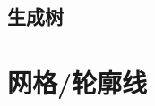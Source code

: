 \subsection{生成树}

\begin{example}
    
\end{example}

\begin{example}[最小斯坦纳树]
    
\end{example}


\section{网格/轮廓线}

\begin{example}[{P2704 [NOI2001] 炮兵阵地}]
    
\end{example}

\begin{example}
    
\end{example}


